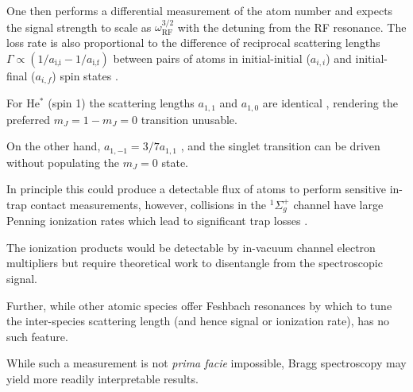 	One then performs a differential measurement of the atom number and expects the signal strength to scale as $\omega_\textrm{RF}^{3/2}$ with the detuning from the RF resonance.
	The loss rate is also proportional to the difference of reciprocal scattering lengths $\Gamma\propto(1/a_\textrm{i,i}-1/a_\textrm{i,f})$ between pairs of atoms in initial-initial ($a_{i,i}$) and initial-final ($a_{i,f}$) spin states \cite{Braaten10,Wild12}.
	
	For He$^*$ (spin 1) the scattering lengths $a_{1,1}$ and $a_{1,0}$ are identical \cite{Leo01}, rendering the preferred $m_J=1-m_J=0$ transition unusable.
	
	On the other hand, $a_{1,-1} = 3/7 a_{1,1}$ \cite{Vassen16}, and the singlet transition can be driven without populating the $m_J=0$ state.
	
	In principle this could produce a detectable flux of atoms to perform sensitive in-trap contact measurements, however, collisions in the $^1\Sigma_{g}^{+}$ channel have large Penning ionization rates which lead to significant trap losses \cite{Leo01}.
	
	The ionization products would be detectable by in-vacuum channel electron multipliers but require theoretical work to disentangle from the spectroscopic signal.
	
	Further, while other atomic species offer Feshbach resonances by which to tune the inter-species scattering length (and hence signal or ionization rate), \mhe has no such feature.
	
	While such a measurement is not \emph{prima facie} impossible, Bragg spectroscopy may yield more readily interpretable results.





